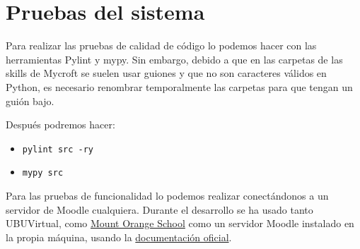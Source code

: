 \section{Pruebas del sistema}
Para realizar las pruebas de calidad de código lo podemos hacer con las herramientas Pylint y mypy. Sin embargo, debido a que en las carpetas de las skills de Mycroft se suelen usar guiones y que no son caracteres válidos en Python, es necesario renombrar temporalmente las carpetas para que tengan un guión bajo.

Después podremos hacer:
\begin{itemize}
    \item \texttt{pylint src -ry}
    \item \texttt{mypy src}
\end{itemize}

Para las pruebas de funcionalidad lo podemos realizar conectándonos a un servidor de Moodle cualquiera. Durante el desarrollo se ha usado tanto UBUVirtual, como \href{https://school.moodledemo.net/}{Mount Orange School} como un servidor Moodle instalado en la propia máquina, usando la \href{https://docs.moodle.org/311/en/Step-by-step_Installation_Guide_for_Ubuntu}{documentación oficial}.